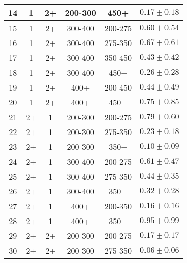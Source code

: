 \begin{table}[htbp]
\begin{tabular}{|c|c|c|c|c||c|}
 \hline
             14 &               1 &              2+ &         200-300 &            450+ & $0.17 \pm 0.18$ \\
 \hline
             15 &               1 &              2+ &         300-400 &         200-275 & $0.60 \pm 0.54$ \\
 \hline
             16 &               1 &              2+ &         300-400 &         275-350 & $0.67 \pm 0.61$ \\
 \hline
             17 &               1 &              2+ &         300-400 &         350-450 & $0.43 \pm 0.42$ \\
 \hline
             18 &               1 &              2+ &         300-400 &            450+ & $0.26 \pm 0.28$ \\
 \hline
             19 &               1 &              2+ &            400+ &         200-450 & $0.44 \pm 0.49$ \\
 \hline
             20 &               1 &              2+ &            400+ &            450+ & $0.75 \pm 0.85$ \\
 \hline
             21 &              2+ &               1 &         200-300 &         200-275 & $0.79 \pm 0.60$ \\
 \hline
             22 &              2+ &               1 &         200-300 &         275-350 & $0.23 \pm 0.18$ \\
 \hline
             23 &              2+ &               1 &         200-300 &            350+ & $0.10 \pm 0.09$ \\
 \hline
             24 &              2+ &               1 &         300-400 &         200-275 & $0.61 \pm 0.47$ \\
 \hline
             25 &              2+ &               1 &         300-400 &         275-350 & $0.44 \pm 0.35$ \\
 \hline
             26 &              2+ &               1 &         300-400 &            350+ & $0.32 \pm 0.28$ \\
 \hline
             27 &              2+ &               1 &            400+ &         200-350 & $0.16 \pm 0.16$ \\
 \hline
             28 &              2+ &               1 &            400+ &            350+ & $0.95 \pm 0.99$ \\
 \hline
             29 &              2+ &              2+ &         200-300 &         200-275 & $0.17 \pm 0.17$ \\
 \hline
             30 &              2+ &              2+ &         200-300 &         275-350 & $0.06 \pm 0.06$ \\

\end{tabular}
\end{table}

